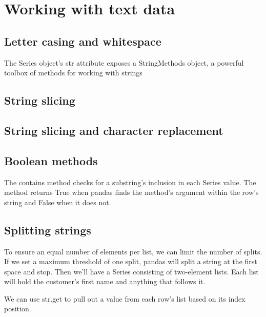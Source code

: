 \chapter{Working with text data\label{Ch06}}
\section{Letter casing and whitespace}
The Series object’s str attribute exposes a StringMethods object, a powerful toolbox of methods for working with strings
\section{String slicing}
\section{String slicing and character replacement}
\section{Boolean methods}
The contains method checks for a substring’s inclusion in each Series value. The method returns True when pandas finds the method’s argument within the row’s string and False when it does not.

\section{Splitting strings}
To ensure an equal number of elements per list, we can limit the number of splits. If we set a maximum threshold of one split, pandas will split a string at the first space and stop. Then we’ll have a Series consisting of two-element lists. Each list will hold the customer’s first name and anything that follows it.

We can use str.get to pull out a value from each row’s list based on its index position.
\section{}
\section{}